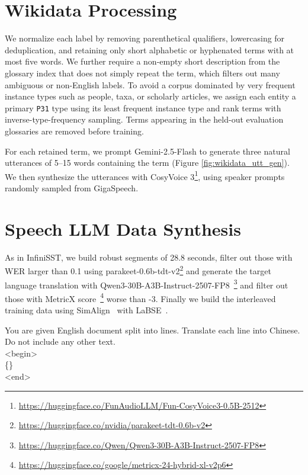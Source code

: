 \section{Wikidata Processing}
\label{sec:apdx_wikidata_proc}
We normalize each label by removing parenthetical qualifiers, lowercasing for deduplication, and retaining only short alphabetic or hyphenated terms with at most five words. We further require a non-empty short description from the glossary index that does not simply repeat the term, which filters out many ambiguous or non-English labels. To avoid a corpus dominated by very frequent instance types such as people, taxa, or scholarly articles, we assign each entity a primary \texttt{P31} type using its least frequent instance type and rank terms with inverse-type-frequency sampling. Terms appearing in the held-out evaluation glossaries are removed before training.

For each retained term, we prompt Gemini-2.5-Flash to generate three natural utterances of 5--15 words containing the term (Figure \ref{fig:wikidata_utt_gen}). We then synthesize the utterances with CosyVoice 3\footnote{\url{https://huggingface.co/FunAudioLLM/Fun-CosyVoice3-0.5B-2512}}, using speaker prompts randomly sampled from GigaSpeech.



\section{Speech LLM Data Synthesis}
\label{sec:speechllm_data_synth}

As in InfiniSST, we build robust segments of 28.8 seconds, filter out those with WER larger than 0.1 using parakeet-0.6b-tdt-v2\footnote{\url{https://huggingface.co/nvidia/parakeet-tdt-0.6b-v2}} and generate the target language translation with Qwen3-30B-A3B-Instruct-2507-FP8~\citep{yang2025qwen3technicalreport}\footnote{\url{https://huggingface.co/Qwen/Qwen3-30B-A3B-Instruct-2507-FP8}} and filter out those with MetricX score~\citep{juraska-etal-2024-metricx}\footnote{\url{https://huggingface.co/google/metricx-24-hybrid-xl-v2p6}} worse than -3. Finally we build the interleaved training data using SimAlign~\citep{jalili-sabet-etal-2020-simalign} with LaBSE~\citep{feng-etal-2022-language}. 

\begin{tcolorbox}[
    colback=gray!5,
    colframe=gray!50,
    title=Translation Prompt,
    fonttitle=\bfseries,
    boxrule=0.5pt
]
\ttfamily\small
You are given English document split into lines. Translate each line into Chinese. Do not include any other text.\\
\textless begin\textgreater\\
\{\}\\
\textless end\textgreater
\end{tcolorbox}

